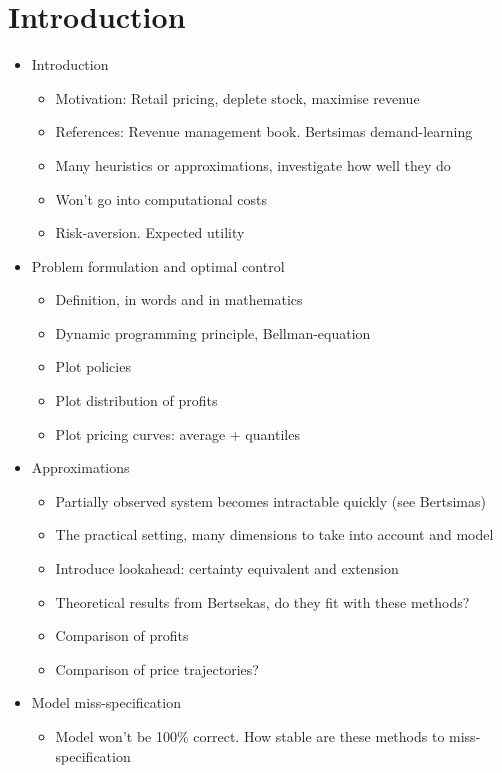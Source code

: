 \documentclass[main.tex]{subfiles}
\begin{document}
\listoftodos[Notes]

\section{Introduction}

\begin{itemize}
\item Introduction
  \begin{itemize}
  \item Motivation: Retail pricing, deplete stock, maximise revenue
  \item References: Revenue management book. Bertsimas demand-learning
  \item Many heuristics or approximations, investigate how well they
    do
  \item Won't go into computational costs
  \item Risk-aversion. Expected utility
  \end{itemize}
\item Problem formulation and optimal control
  \begin{itemize}
  \item Definition, in words and in mathematics
  \item Dynamic programming principle, Bellman-equation
  \item Plot policies
  \item Plot distribution of profits
  \item Plot pricing curves: average + quantiles
  \end{itemize}
\item Approximations
  \begin{itemize}
  \item Partially observed system becomes intractable
    quickly (see Bertsimas)
  \item The practical setting, many dimensions to take into account
    and model
  \item Introduce lookahead: certainty equivalent and extension
  \item Theoretical results from Bertsekas, do they fit with these methods?
  \item Comparison of profits
  \item Comparison of price trajectories?
  \end{itemize}
\item Model miss-specification
  \begin{itemize}
  \item Model won't be 100\% correct. How stable are these methods to miss-specification

\end{itemize}
\end{itemize}
\end{document}
